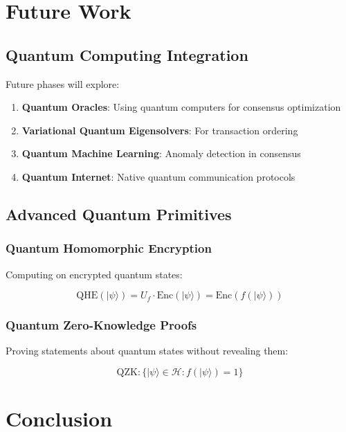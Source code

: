 \documentclass[11pt,a4paper]{article}
\begin{document}
\section{Future Work}

\subsection{Quantum Computing Integration}

Future phases will explore:
\begin{enumerate}
    \item \textbf{Quantum Oracles}: Using quantum computers for consensus optimization
    \item \textbf{Variational Quantum Eigensolvers}: For transaction ordering
    \item \textbf{Quantum Machine Learning}: Anomaly detection in consensus
    \item \textbf{Quantum Internet}: Native quantum communication protocols
\end{enumerate}

\subsection{Advanced Quantum Primitives}

\subsubsection{Quantum Homomorphic Encryption}

Computing on encrypted quantum states:

\begin{equation}
\text{QHE}(|\psi\rangle) = U_f \cdot \text{Enc}(|\psi\rangle) = \text{Enc}(f(|\psi\rangle))
\end{equation}

\subsubsection{Quantum Zero-Knowledge Proofs}

Proving statements about quantum states without revealing them:

\begin{equation}
\text{QZK}: \{|\psi\rangle \in \mathcal{H} : f(|\psi\rangle) = 1\}
\end{equation}

\section{Conclusion}
\end{document}
